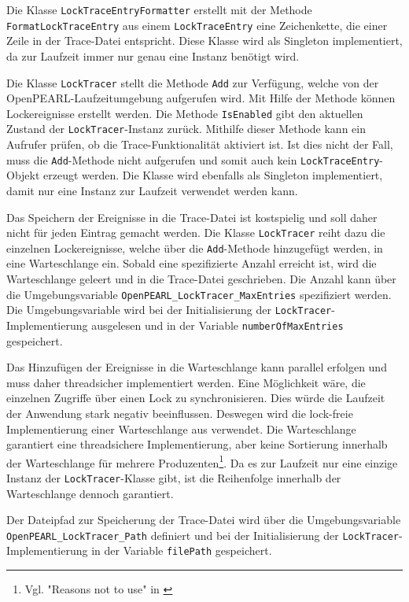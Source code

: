 Die Klasse \texttt{Lock\-Trace\-Entry\-Formatter} erstellt mit der Methode
\texttt{Format\-Lock\-Trace\-Entry} aus einem \texttt{Lock\-Trace\-Entry} eine
Zeichenkette, die einer Zeile in der Trace-Datei entspricht. Diese Klasse wird
als Singleton implementiert, da zur Laufzeit immer nur genau eine Instanz
benötigt wird.

Die Klasse \texttt{Lock\-Tracer} stellt die Methode \texttt{Add} zur Verfügung,
welche von der OpenPEARL-Laufzeitumgebung aufgerufen wird. Mit Hilfe der Methode
können Lockereignisse erstellt werden. Die Methode \texttt{IsEnabled} gibt den
aktuellen Zustand der \texttt{Lock\-Tracer}-Instanz zurück. Mithilfe dieser
Methode kann ein Aufrufer prüfen, ob die Trace-Funktionalität aktiviert ist. Ist
dies nicht der Fall, muss die \texttt{Add}-Methode nicht aufgerufen und somit
auch kein \texttt{Lock\-Trace\-Entry}-Objekt erzeugt werden. Die Klasse wird
ebenfalls als Singleton implementiert, damit nur eine Instanz zur Laufzeit
verwendet werden kann.

Das Speichern der Ereignisse in die Trace-Datei ist kostspielig und soll daher
nicht für jeden Eintrag gemacht werden. Die Klasse \texttt{Lock\-Tracer} reiht
dazu die einzelnen Lockereignisse, welche über die \texttt{Add}-Methode
hinzugefügt werden, in eine Warteschlange ein. Sobald eine spezifizierte Anzahl
erreicht ist, wird die Warteschlange geleert und in die Trace-Datei geschrieben.
Die Anzahl kann über die Umgebungsvariable
\texttt{OpenPEARL\_LockTracer\_MaxEntries} spezifiziert werden. Die
Umgebungsvariable wird bei der Initialisierung der
\texttt{Lock\-Tracer}-Implementierung ausgelesen und in der Variable
\texttt{number\-Of\-Max\-Entries} gespeichert.

Das Hinzufügen der Ereignisse in die Warteschlange kann parallel erfolgen und
muss daher threadsicher implementiert werden. Eine Möglichkeit wäre, die
einzelnen Zugriffe über einen Lock zu synchronisieren. Dies würde die Laufzeit
der Anwendung stark negativ beeinflussen. Deswegen wird die lock-freie
Implementierung einer Warteschlange aus \autocite{Moody_Camels_Concurrentqueue}
verwendet. Die Warteschlange garantiert eine threadsichere Implementierung, aber
keine Sortierung innerhalb der Warteschlange für mehrere
Produzenten\footnote{Vgl. "Reasons not to use" in
\autocite{Moody_Camels_Concurrentqueue}}. Da es zur Laufzeit nur eine einzige
Instanz der \texttt{Lock\-Tracer}-Klasse gibt, ist die Reihenfolge innerhalb der
Warteschlange dennoch garantiert.

Der Dateipfad zur Speicherung der Trace-Datei wird über die Umgebungsvariable
\texttt{OpenPEARL\_LockTracer\_Path} definiert und bei der Initialisierung der
\texttt{LockTracer}-Implementierung in der Variable \texttt{filePath}
gespeichert.

